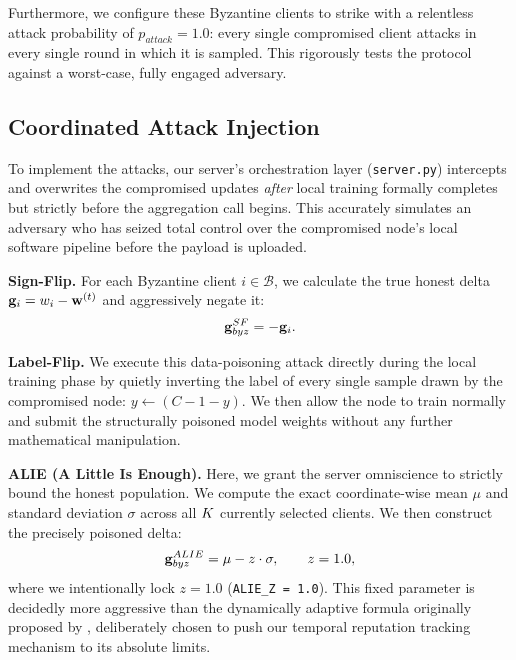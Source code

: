 \documentclass[../main.tex]{subfiles}
\begin{document}
Furthermore, we configure these Byzantine clients to strike with a relentless attack probability of $p_{attack} = 1.0$: every single compromised client attacks in every single round in which it is sampled. This rigorously tests the protocol against a worst-case, fully engaged adversary.

\subsection{Coordinated Attack Injection}
\label{sec:exp_attack_injection}

To implement the attacks, our server's orchestration layer (\texttt{server.py}) intercepts and overwrites the compromised updates \emph{after} local training formally completes but strictly before the aggregation call begins. This accurately simulates an adversary who has seized total control over the compromised node's local software pipeline before the payload is uploaded.

\textbf{Sign-Flip.}
For each Byzantine client $i \in \mathcal{B}$, we calculate the true honest delta $\mathbf{g}_{i} = w_i - \mathbf{w}^{(t)}$ and aggressively negate it:
\begin{equation}
    \mathbf{g}_{byz}^{SF} = -\mathbf{g}_{i}.
    \label{eq:sign_flip_impl}
\end{equation}

\textbf{Label-Flip.}
We execute this data-poisoning attack directly during the local training phase by quietly inverting the label of every single sample drawn by the compromised node: $y \leftarrow (C - 1 - y)$. We then allow the node to train normally and submit the structurally poisoned model weights without any further mathematical manipulation.

\textbf{ALIE (A Little Is Enough).}
Here, we grant the server omniscience to strictly bound the honest population. We compute the exact coordinate-wise mean $\mu$ and standard deviation $\sigma$ across all $K$ currently selected clients. We then construct the precisely poisoned delta:
\begin{equation}
    \mathbf{g}_{byz}^{ALIE} = \mu - z \cdot \sigma, \qquad z = 1.0,
    \label{eq:alie_impl}
\end{equation}
where we intentionally lock $z = 1.0$ (\texttt{ALIE\_Z = 1.0}). This fixed parameter is decidedly more aggressive than the dynamically adaptive formula originally proposed by \citet{baruch2019little}, deliberately chosen to push our temporal reputation tracking mechanism to its absolute limits.
\end{document}

